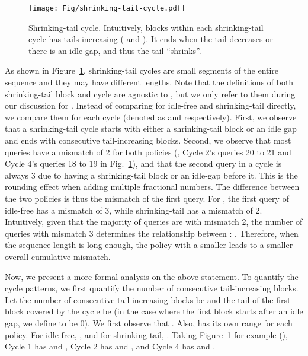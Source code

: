 \begin{figure}[]
\centering
\texttt{[image: Fig/shrinking-tail-cycle.pdf]}

\caption{Shrinking-tail cycle. Intuitively, blocks within each shrinking-tail cycle has tails increasing ( and ). It ends when the tail decreases or there is an idle gap, and thus the tail ``shrinks''.
}
\label{fig:shrinking-tail-cycle}
\end{figure}



As shown in Figure~\ref{fig:shrinking-tail-cycle}, shrinking-tail cycles are small segments of the entire sequence and they may have different lengths. Note that the definitions of both shrinking-tail block and cycle are agnostic to , but we only refer to them during our discussion for .
Instead of comparing  for idle-free and shrinking-tail directly,
we compare them for each cycle (denoted as  and  respectively). First, we observe that a shrinking-tail cycle starts with either a shrinking-tail block or an idle gap and ends with consecutive tail-increasing blocks. Second, we observe that most queries have a mismatch of 2 for both policies (\eg, Cycle 2's queries 20 to 21 and Cycle 4's queries 18 to 19 in Fig.~\ref{fig:shrinking-tail-cycle}), and that the second query in a cycle is always 3 due to having a shrinking-tail block or an idle-gap before it.  This is the rounding effect when adding multiple fractional numbers. The difference between the two policies is thus the mismatch of the first query. For , the first query of idle-free has a mismatch of 3,
while shrinking-tail has a mismatch of 2. 
Intuitively, given that the majority of queries are with mismatch 2, the number of queries with mismatch 3 determines the relationship between : . Therefore, when the sequence length is long enough, the policy with a smaller  leads to a smaller overall cumulative mismatch.

Now, we present a more formal analysis on the above statement. To quantify the cycle patterns, we first quantify the number of consecutive tail-increasing blocks. Let the number of consecutive tail-increasing blocks be  and the tail of the first block covered by the cycle be  (in the case where the first block starts after an idle gap, we define  to be 0). We first observe that . Also,  has its own range for each policy. For idle-free, , and for shrinking-tail, . Taking Figure~\ref{fig:shrinking-tail-cycle} for example (), Cycle 1 has  and , Cycle 2 has  and , and Cycle 4 has  and .

